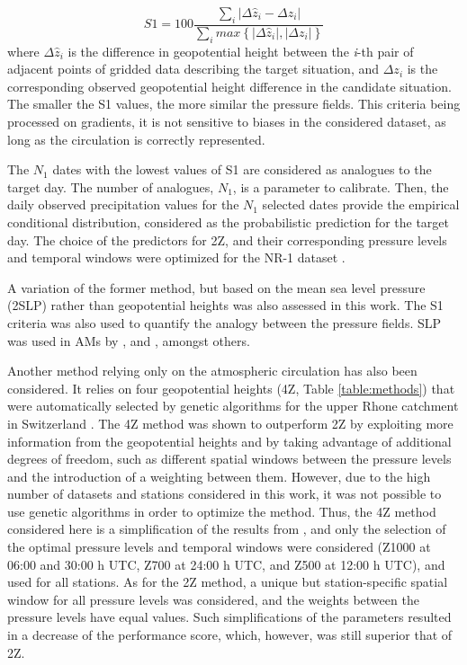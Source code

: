 \documentclass{ametsoc}
\begin{document}
\begin{equation}
\label{eq:S1}
S1=100 \frac {\displaystyle \sum_{i} \vert \Delta\hat{z}_{i} - \Delta z_{i} \vert}
{\displaystyle \sum_{i} max\left\lbrace \vert \Delta\hat{z}_{i} \vert , \vert \Delta z_{i} \vert \right\rbrace }
\end{equation}
where $\Delta \hat{z}_{i}$ is the difference in geopotential height between the \textit{i}-th pair of adjacent points of gridded data describing the target situation, and $\Delta z_{i}$ is the corresponding observed geopotential height difference in the candidate situation. The smaller the S1 values, the more similar the pressure fields. This criteria being processed on gradients, it is not sensitive to biases in the considered dataset, as long as the circulation is correctly represented.

The $N_{1}$ dates with the lowest values of S1 are considered as analogues to the target day. The number of analogues, $N_{1}$, is a parameter to calibrate. Then, the daily observed precipitation values for the $N_{1}$ selected dates provide the empirical conditional distribution, considered as the probabilistic prediction for the target day. The choice of the predictors for 2Z, and their corresponding pressure levels and temporal windows were optimized for the NR-1 dataset \citep{Bontron2004}.

A variation of the former method, but based on the mean sea level pressure (2SLP) rather than geopotential heights was also assessed in this work. The S1 criteria was also used to quantify the analogy between the pressure fields. SLP was used in AMs by \citet{Zorita1999}, \citet{Timbal2001a} and \citet{Martin2014b}, amongst others.

Another method relying only on the atmospheric circulation has also been considered. It relies on four geopotential heights (4Z, Table \ref{table:methods}) that were automatically selected by genetic algorithms for the upper Rhone catchment in Switzerland \citep{Horton2017b}. The 4Z method was shown to outperform 2Z by exploiting more information from the geopotential heights and by taking advantage of additional degrees of freedom, such as different spatial windows between the pressure levels and the introduction of a weighting between them. However, due to the high number of datasets and stations considered in this work, it was not possible to use genetic algorithms in order to optimize the method. Thus, the 4Z method considered here is a simplification of the results from \citet{Horton2017b}, and only the selection of the optimal pressure levels and temporal windows were considered (Z1000 at 06:00 and 30:00 h UTC, Z700 at 24:00 h UTC, and Z500 at 12:00 h UTC), and used for all stations. As for the 2Z method, a unique but station-specific spatial window for all pressure levels was considered, and the weights between the pressure levels have equal values. Such simplifications of the parameters resulted in a decrease of the performance score, which, however, was still superior that of 2Z.
\end{document}
